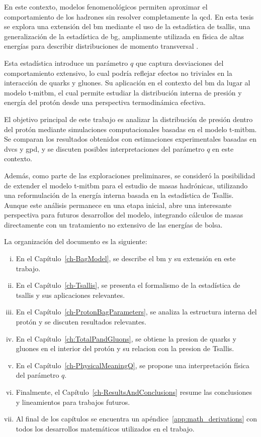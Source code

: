 En este contexto, modelos fenomenológicos permiten aproximar el comportamiento de los hadrones sin resolver completamente la \gls{qcd}. En esta tesis se explora una extensión del \gls{bm} mediante el uso de la estadística de \gls{tsallis}, una generalización de la estadística de \gls{bg}, ampliamente utilizada en física de altas energías para describir distribuciones de momento transversal \cite{Tsallis1988,Beck_2003,Tsallis2009,Tsallis_2009,Marques_2015}.

Esta estadística introduce un parámetro $q$ que captura desviaciones del comportamiento extensivo, lo cual podría reflejar efectos no triviales en la interacción de quarks y gluones. Su aplicación en el contexto del \gls{bm} da lugar al modelo \gls{t-mitbm}, el cual permite estudiar la distribución interna de presión y energía del protón desde una perspectiva termodinámica efectiva.

El objetivo principal de este trabajo es analizar la distribución de presión dentro del protón mediante simulaciones computacionales basadas en el modelo \gls{t-mitbm}. Se comparan los resultados obtenidos con estimaciones experimentales basadas en \gls{dvcs} y \gls{gpd}, y se discuten posibles interpretaciones del parámetro $q$ en este contexto.

Además, como parte de las exploraciones preliminares, se consideró la posibilidad de extender el modelo \gls{t-mitbm} para el estudio de masas hadrónicas, utilizando una reformulación de la energía interna basada en la estadística de Tsallis. Aunque este análisis permanece en una etapa inicial, abre una interesante perspectiva para futuros desarrollos del modelo, integrando cálculos de masas directamente con un tratamiento no extensivo de las energías de bolsa.

La organización del documento es la siguiente:
\begin{enumerate}[i.]
    \item En el Capítulo~\ref{ch-BagModel}, se describe el \gls{bm} y su extensión en este trabajo.
    \item En el Capítulo~\ref{ch-Tsallis}, se presenta el formalismo de la estadística de \gls{tsallis} y sus aplicaciones relevantes.
    \item En el Capítulo~\ref{ch-ProtonBagParameters}, se analiza la estructura interna del protón y se discuten resultados relevantes.
    \item En el Capítulo~\ref{ch:TotalPandGluons}, se obtiene la presion de quarks y gluones en el interior del protón y su relacion con la presion de Tsallis.
    \item En el Capítulo~\ref{ch-PhysicalMeaningQ}, se propone una interpretación física del parámetro $q$.
    \item Finalmente, el Capítulo~\ref{ch-ResultsAndConclusions} resume las conclusiones y lineamientos para trabajos futuros.
    \item Al final de los capítulos se encuentra un apéndice~\ref{app:math_derivations} con todos los desarrollos matemáticos utilizados en el trabajo.
\end{enumerate}


